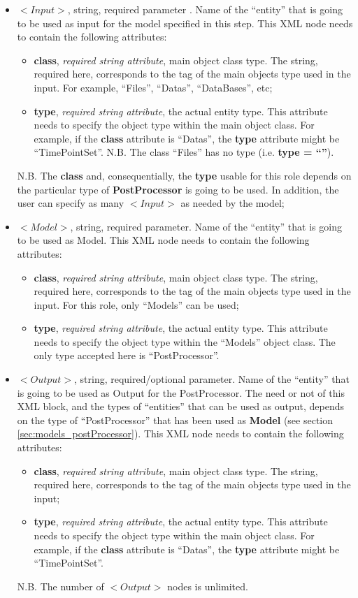 \begin{itemize}
\item $<Input>$, string, required parameter . Name of the ``entity'' that is going to be used as input for the model specified in this step. This XML node needs to contain the following attributes:
\begin{itemize}
  \item \textbf{class}, \textit{required string attribute}, main object class type. The string, required here, corresponds to the tag of the main objects type used in the input. For example, ``Files'', ``Datas'', ``DataBases'', etc;
  \item \textbf{type}, \textit{required string attribute}, the actual entity type. This attribute needs to specify the object type within the main object class. For example, if the  \textbf{class} attribute is ``Datas'', the \textbf{type} attribute might be ``TimePointSet''. N.B. The class ``Files'' has no type (i.e. \textbf{type = ``''}).
\end{itemize}
N.B. The \textbf{class} and, consequentially,  the \textbf{type} usable for this role depends on the particular type of \textbf{PostProcessor} is going to be used. In addition, the user can specify as many $<Input>$ as needed by the model;
\item $<Model>$, string, required parameter. Name of the ``entity'' that is going to be used as Model. This XML node needs to contain the following attributes:
\begin{itemize}
  \item \textbf{class}, \textit{required string attribute}, main object class type. The string, required here, corresponds to the tag of the main objects type used in the input. For this role, only ``Models'' can be used;
  \item \textbf{type}, \textit{required string attribute}, the actual entity type. This attribute needs to specify the object type within the ``Models'' object class. The only type accepted here is ``PostProcessor''.
\end{itemize}
\item $<Output>$, string, required/optional parameter. Name of the ``entity'' that is going to be used as Output for the PostProcessor. The need or not of this XML block, and the types of ``entities'' that can be used as output, depends on the type of ``PostProcessor'' that has been used as \textbf{Model} (see section \ref{sec:models_postProcessor}). This XML node needs to contain the following attributes:
\begin{itemize}
  \item \textbf{class}, \textit{required string attribute}, main object class type. The string, required here, corresponds to the tag of the main objects type used in the input;
  \item \textbf{type}, \textit{required string attribute}, the actual entity type. This attribute needs to specify the object type within the main object class. For example, if the  \textbf{class} attribute is ``Datas'', the \textbf{type} attribute might be ``TimePointSet''.
\end{itemize}
N.B. The number of $<Output>$ nodes is unlimited.
\end{itemize}

